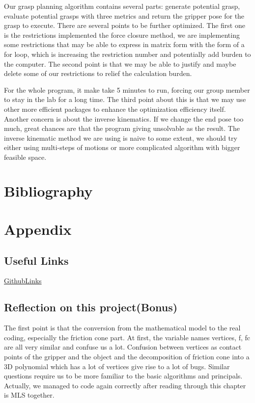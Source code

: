 \documentclass{article}
\begin{document}
\begin{multicols}{2}
Our grasp planning algorithm contains several parts: generate potential grasp, evaluate potential grasps with three metrics and return the gripper pose for the grasp to execute. There are several points to be further optimized. The first one is the restrictions implemented the force closure method, we are implementing some restrictions that may be able to express in matrix form with the form of a for loop, which is increasing the restriction number and potentially add burden to the computer. The second  point is that we may be able to justify and maybe delete some of our restrictions to relief the calculation burden.

For the whole program, it make take 5 minutes to run, forcing our group member to stay in the lab for a long time. The third point about this is that we may use other more efficient packages to enhance the optimization efficiency itself. Another concern is about the inverse kinematics. If we change the end pose too much, great chances are that the program giving unsolvable as the result. The inverse kinematic method we are using is naive to some extent, we should try either using multi-steps of motions or more complicated algorithm with bigger feasible space. 











\pagebreak
\appendix
\section{Bibliography}


\section{Appendix}
\subsection{Useful Links}
\href{https://github.com/ucb-ee106-classrooms/projects-3-4-ambulance/tree/master/project4}{GithubLinks}


\subsection{Reflection on this project(Bonus)}
The first point is that the conversion from the mathematical model to the real coding, especially the friction cone part. At first, the variable names vertices, f, fc are all very similar and confuse us a lot. Confusion between vertices as contact points of the gripper and the object and the decomposition of friction cone into a 3D polynomial which has a lot of vertices give rise to a lot of bugs. Similar questions require us to be more familiar to the basic algorithms and principals. Actually, we managed to code again correctly after reading through this chapter is MLS together.


\end{multicols}
\end{document}
